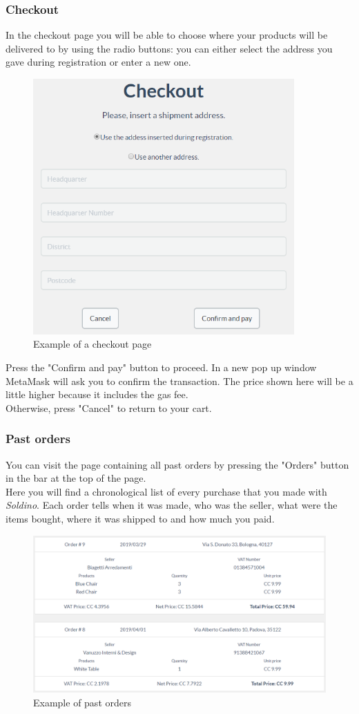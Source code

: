 	\subsubsection{Checkout}
	In the checkout page you will be able to choose where your products will be 
	delivered to by using the radio buttons: you can either select the address you 
	gave during registration or enter a new one.\\
	\begin{figure}[H]
		\includegraphics[width=10cm]{res/images/checkout.png}
		\centering
		\caption{Example of a checkout page}
	\end{figure}
	\noindent Press the "Confirm and pay" button to proceed. In a new 
	pop up window MetaMask will ask you to confirm the transaction. The price 
	shown here will be a little higher because it includes the gas fee. \\
	Otherwise, press "Cancel" to return to your cart.
	\subsubsection{Past orders}
	You can visit the page containing all past orders by pressing the "Orders" 
	button in the bar at the top of the page.\\
	Here you will find a chronological list of every purchase that you made with 
	\textit{Soldino}. Each order tells when it was made, who was the seller, 
	what were the items bought, where it was shipped to and how much you paid.
	\begin{figure}[H]
		\includegraphics[width=15cm]{res/images/past_orders.png}
		\centering
		\caption{Example of past orders}
	\end{figure}